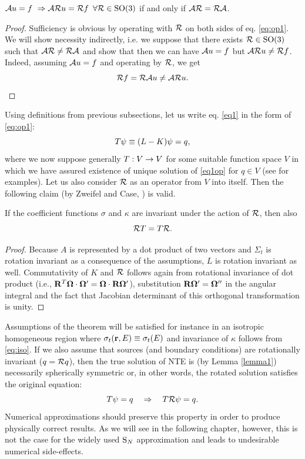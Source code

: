 \begin{lemma}\label{lemma1}
	$\mathcal{A}u = f \ \Rightarrow \mathcal{A}\mathcal{R}u = \mathcal{R}f\,\ \forall \mathcal{R}\in \mathrm{SO}(3)$ if and only if $\mathcal{A}\mathcal{R} = \mathcal{R}\mathcal{A}$.
\end{lemma}
\begin{proof}
	Sufficiency is obvious by operating with $\mathcal{R}$ on both sides of eq. \eqref{eq:op1}.
	We will show necessity indirectly, i.e. we suppose that there exists $\mathcal{R}\in\mathrm{SO}(3)$ such that $\mathcal{A}\mathcal{R} \neq \mathcal{R}\mathcal{A}$
	and show that then we can have $\mathcal{A}u = f$ but $\mathcal{A}\mathcal{R}u \neq \mathcal{R}f$. Indeed, assuming $\mathcal{A}u = f$ and operating by $\mathcal{R}$, we get  
	$$
		\mathcal{R}f = \mathcal{R}\mathcal{A}u \neq \mathcal{A}\mathcal{R}u.
	$$
\end{proof}

Using definitions from previous subsections, let us write eq. \eqref{eq1} in the form of \eqref{eq:op1}:
\begin{equation}\label{eq1op}
	T\psi \equiv (L - K)\psi = q,
\end{equation} 
where we now suppose generally $T:V\to V$ for some suitable function space $V$ in which we have assured existence
of unique solution of \eqref{eq1op} for $q \in V$ (see  for examples). Let us also consider 
$\mathcal{R}$ as an operator from $V$ into itself. Then the following claim (by Zweifel and Case, \cite[Theorem
3]{Zweifel}) is valid.
\begin{theorem}\label{thm:rotinv}
	If the coefficient functions $\sigma$ and $\kappa$ are invariant under the action of $\mathcal{R}$, then also
	\begin{equation}\label{eq:commut_NTE}
		\mathcal{R}T = T\mathcal{R}.
	\end{equation}
\end{theorem}
\begin{proof}
Because $A$ is represented by a dot product of two vectors and $\Sigma_t$ is rotation invariant as a consequence of the
assumptions, $L$ is rotation invariant as well. Commutativity of $K$ and $\mathcal{R}$ follows again from rotational
invariance of dot product (i.e., $\mathbf{R}^T\mathbf{\Omega}\cdot\mathbf{\Omega}' = \mathbf{\Omega}\cdot\mathbf{R}\mathbf{\Omega}'$), substitution $\mathbf{R}\mathbf{\Omega}' = \mathbf{\Omega}''$ in the angular integral and the fact that Jacobian determinant of this
orthogonal transformation is unity.
\end{proof}

Assumptions of the theorem will be satisfied for instance in an isotropic homogeneous region where  $\sigma_t(\mathbf{r},E)
\equiv \sigma_t(E)$ and invariance of $\kappa$ follows from \eqref{eq:iso}. If we also assume that sources (and
boundary conditions) are  rotationally invariant ($q = \mathcal{R}q$), then the true solution of NTE is (by Lemma
\ref{lemma1}) necessarily spherically symmetric or, in other words, the rotated solution satisfies the original
equation:
$$
T\psi = q \quad \Rightarrow \quad T\mathcal{R}\psi = q.
$$
Numerical approximations should preserve this property in order to produce physically correct results. As we will
see in the following chapter, however, this is not the case for the widely used $\text{S}_{N}$ approximation and leads to
undesirable numerical side-effects.
